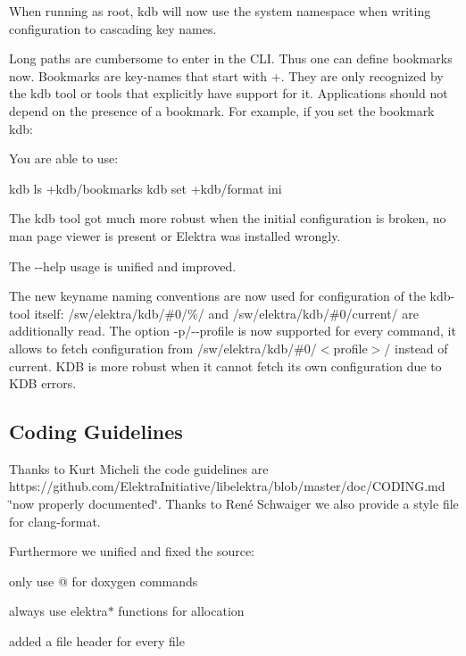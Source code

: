 When running as root, {\ttfamily kdb} will now use the {\ttfamily system} namespace when writing configuration to cascading key names.

Long paths are cumbersome to enter in the C\+L\+I. Thus one can define bookmarks now. Bookmarks are key-\/names that start with {\ttfamily +}. They are only recognized by the {\ttfamily kdb} tool or tools that explicitly have support for it. Applications should not depend on the presence of a bookmark. For example, if you set the bookmark kdb\+: 


You are able to use\+: \begin{DoxyVerb}    kdb ls +kdb/bookmarks
    kdb set +kdb/format ini
\end{DoxyVerb}


The kdb tool got much more robust when the initial configuration is broken, no man page viewer is present or Elektra was installed wrongly.

The {\ttfamily -\/-\/help} usage is unified and improved.

The new keyname naming conventions are now used for configuration of the {\ttfamily kdb}-\/tool itself\+: {\ttfamily /sw/elektra/kdb/\#0/\%/} and {\ttfamily /sw/elektra/kdb/\#0/current/} are additionally read. The option {\ttfamily -\/p}/{\ttfamily -\/-\/profile} is now supported for every command, it allows to fetch configuration from {\ttfamily /sw/elektra/kdb/\#0/$<$profile$>$/} instead of {\ttfamily current}. K\+D\+B is more robust when it cannot fetch its own configuration due to K\+D\+B errors.

\subsection*{Coding Guidelines}

Thanks to Kurt Micheli the code guidelines are https\+://github.com/\+Elektra\+Initiative/libelektra/blob/master/doc/\+C\+O\+D\+I\+N\+G.\+md \char`\"{}now properly documented\char`\"{}. Thanks to René Schwaiger we also provide a style file for clang-\/format.

Furthermore we unified and fixed the source\+:
\begin{DoxyItemize}
\item only use @ for doxygen commands
\item always use elektra$\ast$ functions for allocation
\item added a file header for every file
\end{DoxyItemize}

